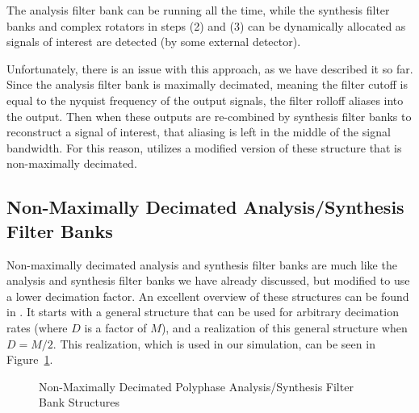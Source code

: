 \documentclass[12pt]{article}
\begin{document}
The analysis filter bank can be running all the time, while the synthesis
filter banks and complex rotators in steps (2) and (3) can be dynamically
allocated as signals of interest are detected (by some external detector).

Unfortunately, there is an issue with this approach, as we have described it so
far. Since the analysis filter bank is maximally decimated, meaning the filter
cutoff is equal to the nyquist frequency of the output signals, the filter
rolloff aliases into the output. Then when these outputs are re-combined by 
synthesis filter banks to reconstruct a signal of interest, that aliasing is left
in the middle of the signal bandwidth.  For this reason, \cite{Harris2} utilizes
a modified version of these structure that is non-maximally decimated.

\subsection{Non-Maximally Decimated Analysis/Synthesis Filter Banks}
Non-maximally decimated analysis and synthesis filter banks are much like the
analysis and synthesis filter banks we have already discussed, but modified to
use a lower decimation factor. An excellent overview of these structures can be
found in \cite{Chen1}. It starts with a general structure that can be used for
arbitrary decimation rates (where $D$ is a factor of $M$), and a realization of
this general structure when $D=M/2$.  This realization, which is used in our
simulation, can be seen in Figure~\ref{fig:poly_analysis_synthesis_nmdfb}.

\begin{figure}[h!]
\centerline{
    \hfill
}

\caption{Non-Maximally Decimated Polyphase Analysis/Synthesis Filter Bank Structures}
\label{fig:poly_analysis_synthesis_nmdfb}
\end{figure}
\end{document}
